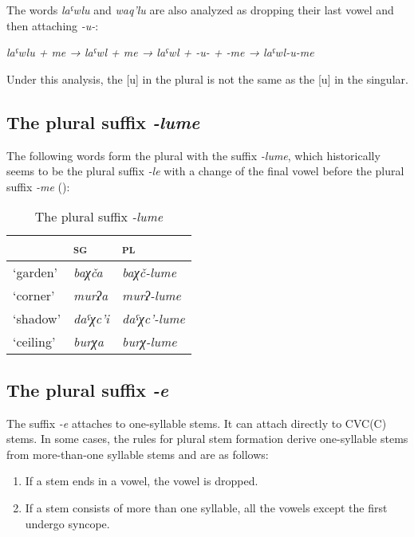 ﻿\documentclass[output=paper]{langsci/langscibook}
\begin{document}
The words \emph{laˤwlu} and \emph{waq'lu} are also analyzed as dropping
their last vowel and then attaching \emph{-u-}:

\medskip
\emph{laˤwlu + me → laˤwl + me → laˤwl + -u- + -me → laˤwl-u-me}

\medskip
Under this analysis, the [u] in the plural is not the same as the
[u] in the singular.

\subsection{The plural suffix \emph{-lume}}
\label{the-plural-suffix--lume}

The following words form the plural with the suffix \emph{-lume}, which
historically seems to be the plural suffix \emph{-le} with a change of
the final vowel before the plural suffix \emph{-me} ():

\begin{table}[b]
  \caption{The plural suffix \emph{-lume}}\label{tab:3:22}
\begin{tabular}{@{}lll@{}}
\toprule
& \textsc{sg} & \textsc{pl}\tabularnewline\midrule
`garden' & \emph{baχča} & \emph{baχč-lume}\tabularnewline
`corner' & \emph{murʔa} & \emph{murʔ-lume}\tabularnewline
`shadow' & \emph{daˤχc'i} & \emph{daˤχc'-lume}\tabularnewline
`ceiling' & \emph{burχa} & \emph{burχ-lume}\tabularnewline
\bottomrule
\end{tabular}
\end{table}

\pagebreak

\subsection{The plural suffix \emph{-e}}
\label{the-plural-suffix--e}

The suffix \emph{-e} attaches to one-syllable stems. It can attach
directly to CVC(C) stems. In some cases, the rules for plural stem
formation derive one-syllable stems from more-than-one syllable stems and
are as follows:
\begin{enumerate}[topsep=\medskipamount,itemsep=0pt,partopsep=0pt,parsep=0pt,label={\arabic*})]
\item %
  If a stem ends in a vowel, the vowel is dropped.

\item %
  If a stem consists of more than one syllable, all the vowels except
the first undergo syncope.
\end{enumerate}
\end{document}
